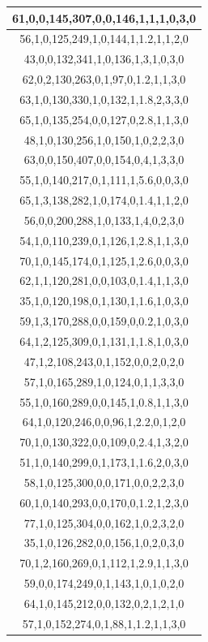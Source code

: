 \documentclass{article}
\begin{document}
\begin{table}[h!]
\begin{tabular}{|c|}
61,0,0,145,307,0,0,146,1,1,1,0,3,0 \\ \hline
56,1,0,125,249,1,0,144,1,1.2,1,1,2,0 \\ \hline
43,0,0,132,341,1,0,136,1,3,1,0,3,0 \\ \hline
62,0,2,130,263,0,1,97,0,1.2,1,1,3,0 \\ \hline
63,1,0,130,330,1,0,132,1,1.8,2,3,3,0 \\ \hline
65,1,0,135,254,0,0,127,0,2.8,1,1,3,0 \\ \hline
48,1,0,130,256,1,0,150,1,0,2,2,3,0 \\ \hline
63,0,0,150,407,0,0,154,0,4,1,3,3,0 \\ \hline
55,1,0,140,217,0,1,111,1,5.6,0,0,3,0 \\ \hline
65,1,3,138,282,1,0,174,0,1.4,1,1,2,0 \\ \hline
56,0,0,200,288,1,0,133,1,4,0,2,3,0 \\ \hline
54,1,0,110,239,0,1,126,1,2.8,1,1,3,0 \\ \hline
70,1,0,145,174,0,1,125,1,2.6,0,0,3,0 \\ \hline
62,1,1,120,281,0,0,103,0,1.4,1,1,3,0 \\ \hline
35,1,0,120,198,0,1,130,1,1.6,1,0,3,0 \\ \hline
59,1,3,170,288,0,0,159,0,0.2,1,0,3,0 \\ \hline
64,1,2,125,309,0,1,131,1,1.8,1,0,3,0 \\ \hline
47,1,2,108,243,0,1,152,0,0,2,0,2,0 \\ \hline
57,1,0,165,289,1,0,124,0,1,1,3,3,0 \\ \hline
55,1,0,160,289,0,0,145,1,0.8,1,1,3,0 \\ \hline
64,1,0,120,246,0,0,96,1,2.2,0,1,2,0 \\ \hline
70,1,0,130,322,0,0,109,0,2.4,1,3,2,0 \\ \hline
51,1,0,140,299,0,1,173,1,1.6,2,0,3,0 \\ \hline
58,1,0,125,300,0,0,171,0,0,2,2,3,0 \\ \hline
60,1,0,140,293,0,0,170,0,1.2,1,2,3,0 \\ \hline
77,1,0,125,304,0,0,162,1,0,2,3,2,0 \\ \hline
35,1,0,126,282,0,0,156,1,0,2,0,3,0 \\ \hline
70,1,2,160,269,0,1,112,1,2.9,1,1,3,0 \\ \hline
59,0,0,174,249,0,1,143,1,0,1,0,2,0 \\ \hline
64,1,0,145,212,0,0,132,0,2,1,2,1,0 \\ \hline
57,1,0,152,274,0,1,88,1,1.2,1,1,3,0 \\ \hline

\end{tabular}
\end{table}
\end{document}
